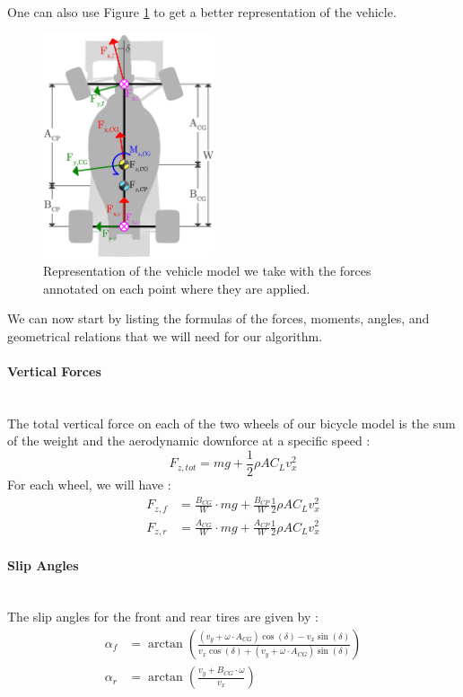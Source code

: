 \documentclass[a4paper, 11pt]{article}
\begin{document}
One can also use Figure \ref{fig:TwoWheelModelTwoWheelSteerFourWheelDrive} to get a better representation of the vehicle.

\begin{figure}[H]
	\centering
	\includegraphics[width = 0.45\textwidth]{Figures/TwoWheelModelTwoWheelSteerFourWheelDrive.eps}
	\caption{Representation of the vehicle model we take with the forces annotated on each point where they are applied.}
	\label{fig:TwoWheelModelTwoWheelSteerFourWheelDrive}
\end{figure}

We can now start by listing the formulas of the forces, moments, angles, and geometrical relations that we will need for our algorithm.

\paragraph{Vertical Forces} ~\\
The total vertical force on each of the two wheels of our bicycle model is the sum of the weight and the aerodynamic downforce at a specific speed :
\begin{equation}
	F_{z,tot} = mg + \frac{1}{2}\rho A C_L v_x^2
	\label{eq:TotalNormalForce}
\end{equation}
For each wheel, we will have :
\begin{align}
	F_{z,f} &= \frac{B_{CG}}{W}\cdot mg + \frac{B_{CP}}{W}\frac{1}{2}\rho A C_L v_x^2\label{eq:FrontNormalForce}\\
	F_{z,r} &= \frac{A_{CG}}{W}\cdot mg + \frac{A_{CP}}{W}\frac{1}{2}\rho A C_L v_x^2\label{eq:RearNormalForce}
\end{align}

\paragraph{Slip Angles} ~\\
The slip angles for the front and rear tires are given by :
\begin{align}
	\alpha_f &= \arctan\left(\frac{\left(v_y + \omega\cdot A_{CG} \right)\cos(\delta) - v_x\sin(\delta)}{v_x\cos(\delta) + \left(v_y + \omega\cdot A_{CG} \right)\sin(\delta)} \right)\label{eq:FrontSlipAngle}\\
	\alpha_r &= \arctan\left(\frac{v_y + B_{CG}\cdot\omega}{v_x} \right)\label{eq:RearSlipAngle}
\end{align}
\end{document}

